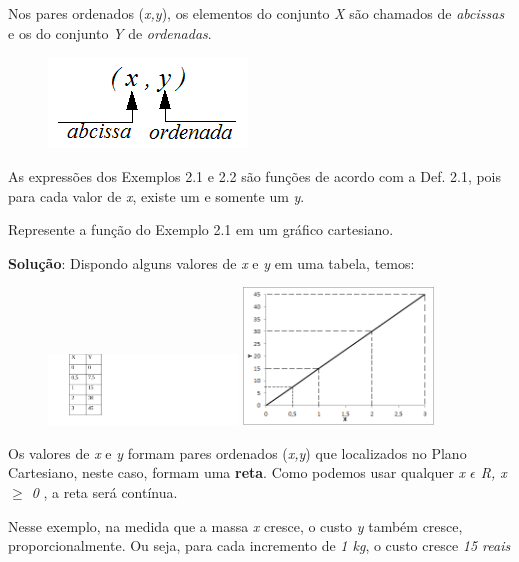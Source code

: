 Nos pares ordenados (\textit{x,y}), os elementos do conjunto \textit{X} são chamados de \textit{abcissas} e os do conjunto \textit{Y} de \textit{ordenadas}.

\begin{figure}[H]
	\begin{Center}
		\includegraphics[width=2.08in,height=0.95in]{capitulos/funcao_do_primeiro_grau/media/image2.png}
	\end{Center}
\end{figure}

As expressões dos Exemplos 2.1 e 2.2 são funções de acordo com a Def. 2.1, pois para cada valor de \textit{x}, existe um e somente um \textit{y}. 

\begin{texemplo}
Represente a função do Exemplo 2.1 em um gráfico cartesiano.

\textbf{Solução}: Dispondo alguns valores de \textit{x} e \textit{y} em uma tabela, temos: 

\begin{figure}[H]
    \includegraphics[width=0.45\textwidth]{capitulos/funcao_do_primeiro_grau/media/image3.pdf} 
    \includegraphics[width=0.45\textwidth]{capitulos/funcao_do_primeiro_grau/media/image4.png}
\end{figure}

Os valores de \textit{x} e \textit{y} formam pares ordenados (\textit{x,y}) que localizados no Plano Cartesiano, neste caso, formam uma \textbf{reta}. Como podemos usar qualquer \textit{x $ \epsilon $  R, x $ \geq $  0} , a reta será contínua.

Nesse exemplo, na medida que a massa \textit{x} cresce, o custo \textit{y} também cresce, proporcionalmente. Ou seja, para cada incremento de \textit{1 kg}, o custo cresce \textit{15 reais} \qedsymbol{}
\end{texemplo}

